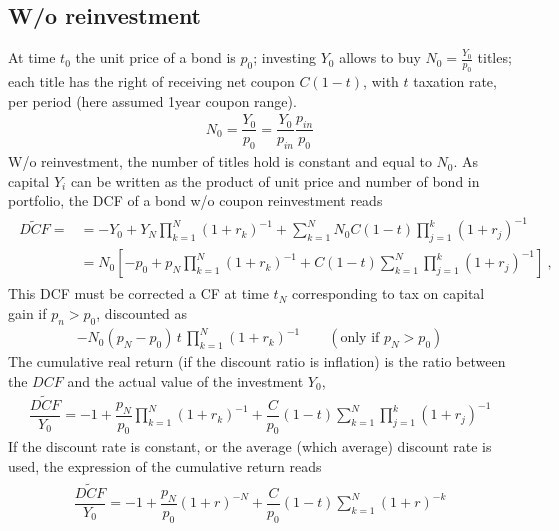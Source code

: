 \documentclass[letterpaper,10pt,english]{jupyterBook}
\begin{document}
\subsection{W/o reinvestment}
\label{\detokenize{ch/assets/bonds:w-o-reinvestment}}
\sphinxAtStartPar
At time \(t_0\) the unit price of a bond is \(p_0\); investing \(Y_0\) allows to buy \(N_0 = \frac{Y_0}{p_0}\) titles; each title has the right of receiving net coupon \(C (1 - t)\), with \(t\) taxation rate, per period (here assumed 1\sphinxhyphen{}year coupon range).
\begin{equation*}
\begin{split}N_0 = \dfrac{Y_0}{p_0} = \dfrac{Y_0}{p_{in}} \dfrac{p_{in}}{p_0}\end{split}
\end{equation*}
\sphinxAtStartPar
W/o reinvestment, the number of titles hold is constant and equal to \(N_0\). As capital \(Y_i\) can be written as the product of unit price and number of bond in portfolio, the DCF of a bond w/o coupon reinvestment reads
\begin{equation*}
\begin{split}\begin{aligned}
  \widetilde{DCF} =
  & = - Y_0 + Y_N \prod_{k=1}^N ( 1 + r_k )^{-1} + \sum_{k=1}^{N} N_0 C (1-t) \prod_{j=1}^{k} (1 + r_j )^{-1} \\ 
  & = N_0 \left[ - p_0 + p_N \prod_{k=1}^N ( 1 + r_k )^{-1} + C (1-t) \sum_{k=1}^{N} \prod_{j=1}^{k} (1 + r_j )^{-1} \right] \ , 
\end{aligned}\end{split}
\end{equation*}
\sphinxAtStartPar
This DCF must be corrected a CF at time \(t_N\) corresponding to tax on capital gain if \(p_n > p_0\), discounted as
\begin{equation*}
\begin{split}- N_0( p_N  - p_0) \,  t \,  \prod_{k=1}^{N} (1+r_k)^{-1}  \qquad  (\text{only if $p_N > p_0$})\end{split}
\end{equation*}
\sphinxAtStartPar
The cumulative real return (if the discount ratio is inflation) is the ratio between the \(DCF\) and the actual value of the investment \(Y_0\),
\begin{equation*}
\begin{split}\widetilde{\dfrac{DCF}{Y_0}} = - 1 + \dfrac{p_N}{p_0} \prod_{k=1}^N ( 1 + r_k )^{-1} + \dfrac{C}{p_0} (1-t) \sum_{k=1}^{N} \prod_{j=1}^{k} (1 + r_j )^{-1}  \end{split}
\end{equation*}
\sphinxAtStartPar
If the discount rate is constant, or the average (which average) discount rate is used, the expression of the cumulative return reads
\begin{equation*}
\begin{split}\begin{aligned}
  \dfrac{\widetilde{DCF}}{Y_0} = - 1 + \dfrac{p_N}{p_0} ( 1 + r )^{-N} + \dfrac{C}{p_0} (1-t) \sum_{k=1}^{N} (1 + r )^{-k}  
\end{aligned}\end{split}
\end{equation*}
\end{document}
